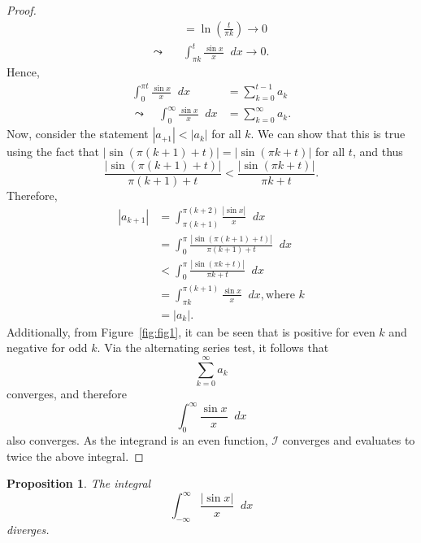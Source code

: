 \documentclass[a4paper]{article}
\newcommand*\diff{\mathop{}\!d} %
\newtheorem{proposition}[theorem]{Proposition}
\theoremstyle{definition}
\begin{document}
\begin{proof}
\begin{align*}
                                                                & = \ln \left(\frac{t}{\pi k}\right) \to 0         \\
        \leadsto   \quad                                        & \int_{\pi k}^{t} \frac{\sin x}{x} \diff x \to 0.
    \end{align*}
    Hence,
    \begin{align*}
        \int_{0}^{\pi t} \frac{\sin x}{x} \diff x                 & = \sum_{k=0}^{t-1} a_k     \\
        \leadsto \quad \int_{0}^{\infty} \frac{\sin x}{x} \diff x & = \sum_{k=0}^{\infty} a_k.
    \end{align*}
    Now, consider the statement $|a_{+1}| < |a_k|$ for all $k$.
    We can show that this is true using the fact that $|\sin (\pi (k+1) + t)| = |\sin(\pi k + t)|$ for all $t$, and thus
    \begin{equation*}
        \frac{|\sin (\pi (k+1) + t)|}{\pi(k+1) + t} < \frac{|\sin (\pi k + t)|}{\pi k + t}.
    \end{equation*}
    Therefore,
    \begin{align*}
        |a_{k+1}| & = \int_{\pi (k+1)}^{\pi(k+2)} \frac{|\sin x|}{x} \diff x              \\
                  & = \int_{0}^{\pi} \frac{|\sin (\pi (k+1) + t)|}{\pi (k+1) + t} \diff x \\
                  & < \int_{0}^{\pi} \frac{|\sin (\pi k + t)|}{\pi k + t} \diff x         \\
                  & = \int_{\pi k}^{\pi(k+1)} \frac{\sin x}{x} \diff x, \text{where } k   \\
                  & = |a_k|.
    \end{align*}
    Additionally, from Figure~\ref{fig:fig1}, it can be seen that is positive for even $k$ and negative for odd $k$.
    Via the alternating series test, it follows that
    \begin{equation*}
        \sum_{k=0}^{\infty} a_k
    \end{equation*}
    converges, and therefore
    \begin{equation*}
        \int_{0}^{\infty} \frac{\sin x}{x} \diff x
    \end{equation*}
    also converges.
    As the integrand is an even function, $\mathcal{I}$ converges and evaluates to twice the above integral.
\end{proof}
\begin{proposition} \label{thm:convergence proposition 2}
    The integral
    \begin{equation*}
        \int_{-\infty}^{\infty} \frac{|\sin x|}{x} \diff x
    \end{equation*}
    diverges.
\end{proposition}
\end{document}
